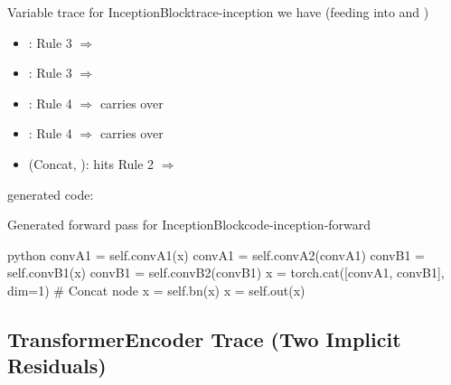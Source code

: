 \documentclass{nngraph-en}
\begin{document}
\begin{exbox}{Variable trace for InceptionBlock}{trace-inception}
we have  (feeding into  and )

\begin{itemize}
    \item {}: Rule 3 $\Rightarrow$ 
    \item {}: Rule 3 $\Rightarrow$ 
    \item {}: Rule 4 $\Rightarrow$ carries over 
    \item {}: Rule 4 $\Rightarrow$ carries over 
    \item {} (Concat, ): hits Rule 2 $\Rightarrow$ 
\end{itemize}

generated code:
\begin{codebox}{Generated forward pass for InceptionBlock}{code-inception-forward}
\begin{amzcode}{python}
convA1 = self.convA1(x)
convA1 = self.convA2(convA1)
convB1 = self.convB1(x)
convB1 = self.convB2(convB1)
x      = torch.cat([convA1, convB1], dim=1)  # Concat node
x      = self.bn(x)
x      = self.out(x)
\end{amzcode}
\end{codebox}
\end{exbox}

\subsection{TransformerEncoder Trace (Two Implicit Residuals)}
\end{document}
